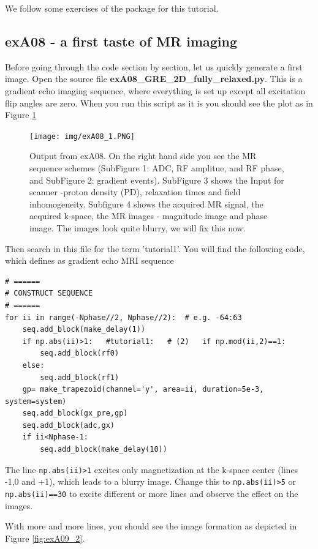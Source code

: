 \documentclass[a4paper,12pt]{extarticle}
\begin{document}
We follow some exercises of the package for this tutorial.

\subsection{exA08 - a first taste of MR imaging}
Before going through the code section by section, let us quickly generate a first image. Open the source file \textbf{exA08\_GRE\_2D\_fully\_relaxed.py}. This is a gradient echo imaging sequence, where everything is set up except all excitation flip angles are zero. When you run this script as it is you should see the plot as in Figure \ref{fig:exA08_1}

\begin{figure}[!ht] 
\centering
\texttt{[image: img/exA08\_1.PNG]}
\caption{Output from exA08. On the right hand side you see the MR sequence schemes (SubFigure 1: ADC, RF amplitue, and RF phase, and SubFigure 2: gradient events). SubFigure 3 shows the Input for scanner -proton density (PD), relaxation times and field inhomogeneity. Subfigure 4 shows the acquired MR signal, the acquired k-space, the MR images - magnitude image and phase image. The images look quite blurry, we will fix this now. }\label{fig:exA08_1}
\end{figure}

Then search in this file for the term 'tutorial1'. You will find the following code, which defines as gradient echo MRI sequence

\begin{verbatim}
# ======
# CONSTRUCT SEQUENCE
# ======
for ii in range(-Nphase//2, Nphase//2):  # e.g. -64:63
    seq.add_block(make_delay(1))
    if np.abs(ii)>1:   #tutorial1:   # (2)   if np.mod(ii,2)==1:    
        seq.add_block(rf0)
    else:
        seq.add_block(rf1)
    gp= make_trapezoid(channel='y', area=ii, duration=5e-3, system=system)
    seq.add_block(gx_pre,gp)
    seq.add_block(adc,gx)
    if ii<Nphase-1:
        seq.add_block(make_delay(10))
\end{verbatim}

The line \texttt{np.abs(ii)>1} excites only magnetization at the k-space center (lines -1,0 and +1), which leads to a blurry image. Change this to \texttt{np.abs(ii)>5} or \texttt{np.abs(ii)==30}  to excite different or more lines and observe the effect on the images.


With more and more lines, you should see the image formation as depicted in Figure \ref{fig:exA09_2}.
\end{document}
